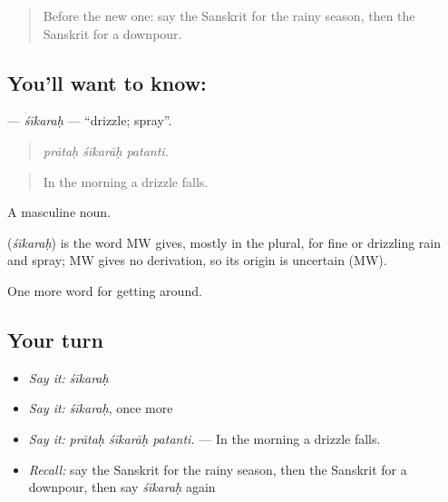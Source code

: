 \label{lesson:SA-C437-sikarah}



\begin{quote}
Before the new one: say the Sanskrit for the rainy season, then the Sanskrit for a downpour.
\end{quote}

\subsection*{You'll want to know: }
\textbf{} — \emph{śīkaraḥ} — \textquotedblleft{}drizzle; spray\textquotedblright{}.

\begin{quote}
  
\end{quote}

\begin{quote}
\emph{prātaḥ śīkarāḥ patanti.}
\end{quote}

\begin{quote}
In the morning a drizzle falls.
\end{quote}

A masculine noun.

\begin{cousinweb}
\textbf{} (\emph{śīkaraḥ}) is the word MW gives, mostly in the plural, for fine or drizzling rain and spray; MW gives no derivation, so its origin is uncertain (MW).
\end{cousinweb}

\begin{grammarlens}[title={What you've built}]
One more word for getting around.
\end{grammarlens}

\subsection*{Your turn}
\begin{itemize}
\raggedright
  \item \emph{Say it:} \emph{śīkaraḥ}
  \item \emph{Say it:} \emph{śīkaraḥ}, once more
  \item \emph{Say it:} \emph{prātaḥ śīkarāḥ patanti.} — In the morning a drizzle falls.
  \item \emph{Recall:} say the Sanskrit for the rainy season, then the Sanskrit for a downpour, then say \emph{śīkaraḥ} again
\end{itemize}

